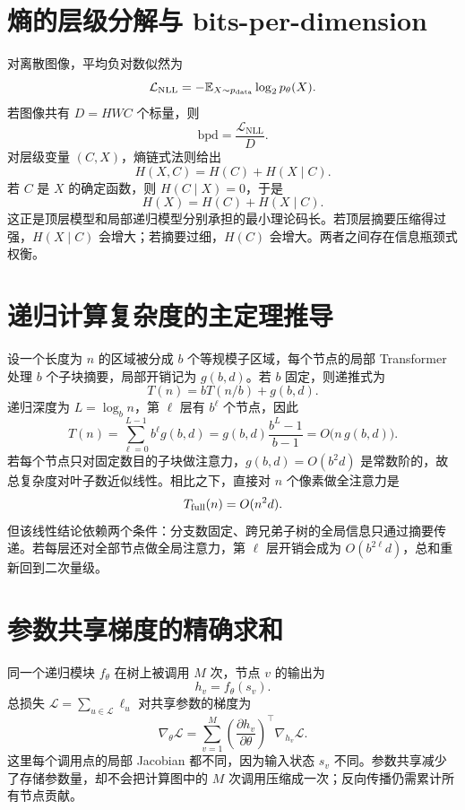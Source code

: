 \documentclass[UTF8,12pt,a4paper,fontset=none]{ctexart}
\numberwithin{equation}{section}
\newcommand{\E}{\mathbb{E}}
\newcommand{\Loss}{\mathcal{L}}
\begin{document}
\section{熵的层级分解与 bits-per-dimension}
对离散图像，平均负对数似然为
\begin{equation}
 \Loss_{\mathrm{NLL}}=-\E_{X\sim p_{\rm data}}\log_2 p_\theta(X).
\end{equation}
若图像共有 $D=HWC$ 个标量，则
\begin{equation}
 \mathrm{bpd}=\frac{\Loss_{\mathrm{NLL}}}{D}.
\end{equation}
对层级变量 $(C,X)$，熵链式法则给出
\begin{equation}
 H(X,C)=H(C)+H(X\mid C).
\end{equation}
若 $C$ 是 $X$ 的确定函数，则 $H(C\mid X)=0$，于是
\begin{equation}
 H(X)=H(C)+H(X\mid C).
\end{equation}
这正是顶层模型和局部递归模型分别承担的最小理论码长。若顶层摘要压缩得过强，$H(X\mid C)$ 会增大；若摘要过细，$H(C)$ 会增大。两者之间存在信息瓶颈式权衡。

\section{递归计算复杂度的主定理推导}
设一个长度为 $n$ 的区域被分成 $b$ 个等规模子区域，每个节点的局部 Transformer 处理 $b$ 个子块摘要，局部开销记为 $g(b,d)$。若 $b$ 固定，则递推式为
\begin{equation}
 T(n)=bT(n/b)+g(b,d).
\end{equation}
递归深度为 $L=\log_b n$，第 $\ell$ 层有 $b^\ell$ 个节点，因此
\begin{equation}
 T(n)=\sum_{\ell=0}^{L-1}b^\ell g(b,d)
 =g(b,d)\frac{b^L-1}{b-1}
 =O\bigl(n\,g(b,d)\bigr).
\end{equation}
若每个节点只对固定数目的子块做注意力，$g(b,d)=O(b^2d)$ 是常数阶的，故总复杂度对叶子数近似线性。相比之下，直接对 $n$ 个像素做全注意力是
\begin{equation}
 T_{\rm full}(n)=O(n^2d).
\end{equation}
但该线性结论依赖两个条件：分支数固定、跨兄弟子树的全局信息只通过摘要传递。若每层还对全部节点做全局注意力，第 $\ell$ 层开销会成为 $O(b^{2\ell}d)$，总和重新回到二次量级。

\section{参数共享梯度的精确求和}
同一个递归模块 $f_\theta$ 在树上被调用 $M$ 次，节点 $v$ 的输出为
\begin{equation}
 h_v=f_\theta(s_v).
\end{equation}
总损失 $\Loss=\sum_{u\in\mathcal L}\ell_u$ 对共享参数的梯度为
\begin{equation}
 \nabla_\theta\Loss
 =\sum_{v=1}^{M}
 \left(\frac{\partial h_v}{\partial\theta}\right)^{\!\top}
 \nabla_{h_v}\Loss.
\end{equation}
这里每个调用点的局部 Jacobian 都不同，因为输入状态 $s_v$ 不同。参数共享减少了存储参数量，却不会把计算图中的 $M$ 次调用压缩成一次；反向传播仍需累计所有节点贡献。
\end{document}
